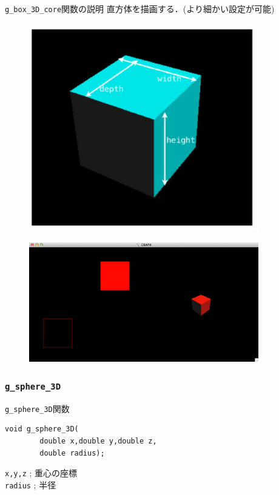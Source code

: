\documentclass[a4paper,12pt]{jsarticle}%
\begin{document}
\begin{itembox}[l]{\texttt{g\_box\_3D\_core}関数の説明}
直方体を描画する．(より細かい設定が可能)
\end{itembox}
\begin{figure}[htb]
	\includegraphics[width=100mm]{./Figures/eps/Canvas_g_box.eps}
\end{figure}

\begin{figure}[htb]
	\includegraphics[width=100mm]{./Figures/eps/Canvas_g_box2.eps}
\end{figure}


\clearpage
\subsubsection{\texttt{g\_sphere\_3D}}

\begin{itembox}[l]{\texttt{g\_sphere\_3D}関数}
\begin{verbatim}
void g_sphere_3D(
        double x,double y,double z,
        double radius);   
\end{verbatim}
\verb|x,y,z| ; 重心の座標\\
\verb|radius| ; 半径\\
\end{itembox}
\end{document}

